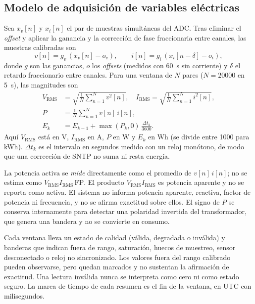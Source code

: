\subsection{Modelo de adquisición de variables eléctricas}
\label{sec:acquisition}
Sea $x_v[n]$ y $x_i[n]$ el par de muestras simultáneas del ADC.
Tras eliminar el \textit{offset} y aplicar la ganancia y la corrección de fase fraccionaria entre canales, las muestras calibradas son
\begin{equation}
v[n]=g_v\,(x_v[n]-o_v),\qquad i[n]=g_i\,(x_i[n-\delta]-o_i),
\label{eq:calib}
\end{equation}
donde $g$ son las ganancias, $o$ los \textit{offsets} (medidos con \SI{60}{s} sin corriente) y $\delta$ el retardo fraccionario entre canales.
Para una ventana de $N$ pares ($N=\num{20000}$ en \SI{5}{s}), las magnitudes son
\begin{align}
V_{\mathrm{RMS}}&=\sqrt{\frac{1}{N}\sum_{n=1}^{N}v^{2}[n]},\quad
I_{\mathrm{RMS}}=\sqrt{\frac{1}{N}\sum_{n=1}^{N}i^{2}[n]},
\label{eq:rms}\\
P&=\frac{1}{N}\sum_{n=1}^{N}v[n]\,i[n],
\label{eq:power}\\
E_{k}&=E_{k-1}+\max(P_{k},0)\,\frac{\Delta t_{k}}{3600}.
\label{eq:energy}
\end{align}
Aquí $V_{\mathrm{RMS}}$ está en V, $I_{\mathrm{RMS}}$ en A, $P$ en W y $E_k$ en Wh (se divide entre \num{1000} para kWh).
$\Delta t_k$ es el intervalo en segundos medido con un reloj monótono, de modo que una corrección de SNTP no suma ni resta energía.

La potencia activa se \emph{mide} directamente como el promedio de $v[n]\,i[n]$; no se estima como $V_{\mathrm{RMS}}I_{\mathrm{RMS}}\,\mathrm{FP}$.
El producto $V_{\mathrm{RMS}}I_{\mathrm{RMS}}$ es potencia aparente y no se reporta como activa.
El sistema no informa potencia aparente, reactiva, factor de potencia ni frecuencia, y no se afirma exactitud sobre ellos.
El signo de $P$ se conserva internamente para detectar una polaridad invertida del transformador, que genera una bandera y no se convierte en consumo.

Cada ventana lleva un estado de calidad (válida, degradada o inválida) y banderas que indican fuera de rango, saturación, huecos de muestreo, sensor desconectado o reloj no sincronizado.
Los valores fuera del rango calibrado pueden observarse, pero quedan marcados y no sustentan la afirmación de exactitud.
Una lectura inválida nunca se interpreta como cero ni como estado seguro.
La marca de tiempo de cada resumen es el fin de la ventana, en UTC con milisegundos.

